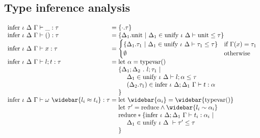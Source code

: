 \documentclass[manuscript]{acmart}
\begin{document}
\subsection*{Type inference analysis}

\[
  \begin{array}{l @{} l}
    \text{infer } \iota\ \Delta\ \Gamma \vdash 
    \_ : \tau
    &{} =
    \{\cdot.\tau\}
    \\

    \text{infer } \iota\ \Delta\ \Gamma \vdash 
    () : \tau
    &{} =
    \begin{array}[t]{@{} l}
      \{\Delta_1.\text{unit}\ |
      \ \Delta_1 \in \text{unify } \iota\ \Delta \vdash \text{unit} \leq \tau
      \}
    \end{array}
    \\

    \text{infer } \iota\ \Delta\ \Gamma \vdash 
    x : \tau
    &{} =
    \begin{cases}  
      \{\Delta_1.\tau_1\ |
      \ \Delta_1 \in \text{unify } \iota\ \Delta \vdash \tau_1 \leq \tau
      \}
      &\text{if } \Gamma(x) = \tau_1
      \\
      \emptyset
      &\text{otherwise}
    \end{cases}
    \\

    \text{infer } \iota\ \Delta\ \Gamma \vdash 
    l ; t : \tau
    &{} =
    \begin{array}[t]{@{} l}
      \text{let } \alpha = \text{typevar}() 
      \\
      \{\Delta_1;\Delta_2\ .\ l ; \tau_1 \ |
      \\
      \ \ \ \ \Delta_1 \in \text{unify } \iota\ \Delta \vdash l ; \alpha \leq \tau
      \\
      \ \ \ \ (\Delta_2.\tau_1) \in \text{infer } \iota\ \Delta;\Delta_1\ \Gamma \vdash t : \alpha
      \\
      \}
    \end{array}
    \\

    \text{infer } \iota\ \Delta\ \Gamma \vdash 
    \omega\ \widebar{l_i \approx t_i} : \tau
    &{} =
    \begin{array}[t]{@{} l}
      \text{let } \widebar{\alpha_i} = \widebar{\text{typevar}()}
      \\
      \text{let } \tau' = \text{reduce} \wedge \widebar{l_i \sim \alpha_i}
      \\
      \text{reduce} * \{
      \text{infer } \iota\ \Delta;\Delta_1\ \Gamma \vdash t_i : \alpha_i\ |\ 
      \\
      \ \ \ \ \Delta_1 \in \text{unify } \iota\ \Delta\ \vdash \tau' \leq \tau
      \\
      \}
      \\
    \end{array}
    \\


\end{array}\]
\end{document}
